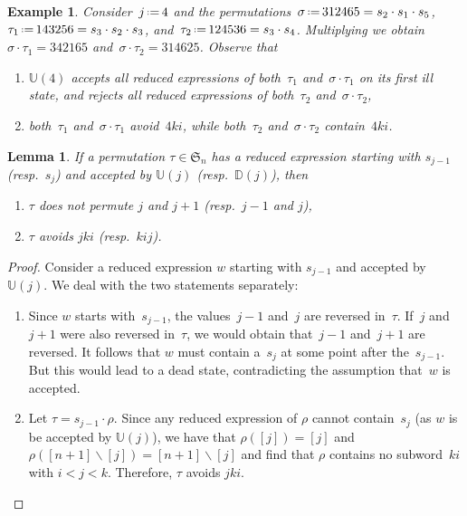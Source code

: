 \documentclass{amsart}
\newtheorem{lemma}[theorem]{Lemma}
\newtheorem{example}[theorem]{Example}
\newcommand{\fS}{\mathfrak{S}} %
\newcommand{\ssm}{\smallsetminus} %
\newcommand{\eqdef}{\mbox{\,\raisebox{0.2ex}{\scriptsize\ensuremath{\mathrm:}}\ensuremath{=}\,}} %
\newcommand{\automatonU}{\mathbb{U}} %
\newcommand{\automatonD}{\mathbb{D}} %
\begin{document}
\begin{example}\label{exm:lemVincent2}
Consider~$j \eqdef 4$ and the permutations~$\sigma \eqdef 312465 = s_2 \cdot s_1 \cdot s_5$, $\tau_1 \eqdef 143256 = s_3 \cdot s_2 \cdot s_3$, and~$\tau_2 \eqdef 124536 = s_3 \cdot s_4$.
Multiplying we obtain~$\sigma\cdot\tau_1=342165$ and~$\sigma\cdot\tau_2 = 314625$. Observe that
\begin{enumerate}
	\item $\automatonU(4)$ accepts all reduced expressions of both~$\tau_1$ and~$\sigma\cdot \tau_1$ on its first ill state, and rejects all reduced expressions of both~$\tau_2$ and~$\sigma\cdot \tau_2$,
	\item both~$\tau_1$ and~$\sigma\cdot\tau_1$ avoid~$4ki$, while both~$\tau_2$ and~$\sigma\cdot\tau_2$ contain~$4ki$.
\end{enumerate}
\end{example}

\begin{lemma}\label{lem:vincent3}
If a permutation $\tau \in \fS_n$ has a reduced expression starting with $s_{j-1}$ (resp.~$s_j$) and accepted by $\automatonU(j)$ (resp.~$\automatonD(j)$), then
\begin{enumerate} 
	\item $\tau$ does not permute $j$ and $j+1$ (resp.~$j-1$ and $j$),
	\item $\tau$ avoids $jki$ (resp.~$kij$).
\end{enumerate}
\end{lemma}

\begin{proof}
Consider a reduced expression $w$ starting with $s_{j-1}$ and accepted by~$\automatonU(j)$. 
We deal with the two statements separately:
\begin{enumerate} 
	\item Since $w$ starts with~$s_{j-1}$, the values~$j-1$ and~$j$ are reversed in~$\tau$. If~$j$ and~$j+1$ were also reversed in~$\tau$, we would obtain that~$j-1$ and~$j+1$ are reversed. It follows that $w$ must contain a~$s_j$ at some point after the~$s_{j-1}$. But this would lead to a dead state, contradicting the assumption that~$w$ is accepted.
	\item Let $\tau = s_{j-1}\cdot \rho$. Since any reduced expression of $\rho$ cannot contain~$s_j$ (as $w$ is be accepted by $\automatonU(j)$), we have that $\rho([j]) = [j]$ and $\rho([n+1] \ssm [j]) = [n+1] \ssm [j]$ and find that $\rho$ contains no subword~$ki$ with $i < j < k$. Therefore, $\tau$ avoids $jki$.
	\qedhere
\end{enumerate}
\end{proof}
\end{document}

